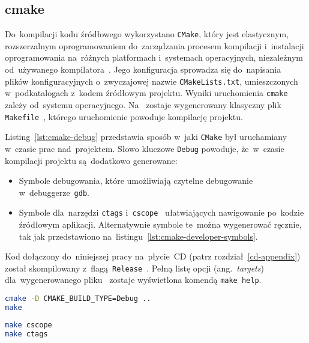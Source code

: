 \documentclass[thesis]{subfiles}
\begin{document}

\subsection{cmake}

Do~kompilacji kodu źródłowego wykorzystano \texttt{CMake}, który jest elastycznym, rozszerzalnym oprogramowaniem do~zarządzania procesem kompilacji i~instalacji oprogramowania na~różnych platformach i~systemach operacyjnych, niezależnym od~używanego kompilatora~\cite{cmake}. Jego konfiguracja sprowadza się do~napisania plików konfiguracyjnych o~zwyczajowej nazwie \mbox{\texttt{CMakeLists.txt}}, umieszczonych w~podkatalogach z~kodem źródłowym projektu. Wyniki uruchomienia \texttt{cmake} zależy od~systemu operacyjnego. Na~ zostaje wygenerowany klasyczny plik \texttt{Makefile}~\cite{gnu-makefile-manual}, którego uruchomienie powoduje kompilację projektu.

Listing~\ref{lst:cmake-debug} przedstawia sposób w~jaki \texttt{CMake} był uruchamiany w~czasie prac nad~projektem. Słowo kluczowe \texttt{Debug} powoduje, że~w~czasie kompilacji projektu są~dodatkowo generowane:
\begin{itemize}
\item Symbole debugowania, które umożliwiają czytelne debugowanie w~debuggerze~\texttt{gdb}.
\item Symbole dla~narzędzi \texttt{ctags} i~\texttt{cscope}~\cite{ctags,cscope} ułatwiających nawigowanie po~kodzie źródłowym aplikacji. Alternatywnie symbole te~można wygenerować ręcznie, tak jak przedstawiono na~listingu~\ref{lst:cmake-developer-symbols}.
\end{itemize}
Kod dołączony do~niniejszej pracy na~płycie~CD (patrz rozdział~\ref{cd-appendix}) został skompilowany z~flagą~\texttt{Release}~\cite{cmake-compilation-type-manual,cmake-compilation-type-stackoverflow}. Pełną listę opcji (ang.~\emph{targets}) dla~wygenerowanego pliku~ zostaje wyświetlona komendą \texttt{make~help}.

\begin{lstlisting}[label=lst:cmake-debug,language=bash,numbers=none,caption={Uruchomienie \texttt{cmake} w~trybie \texttt{Debug}}]
cmake -D CMAKE_BUILD_TYPE=Debug ..
make
\end{lstlisting}

\begin{lstlisting}[label=lst:cmake-developer-symbols,language=bash,numbers=none,caption={Generowanie symboli dla~narzędzi \texttt{cscope} i~\texttt{ctags}}]
make cscope
make ctags
\end{lstlisting}
\end{document}
